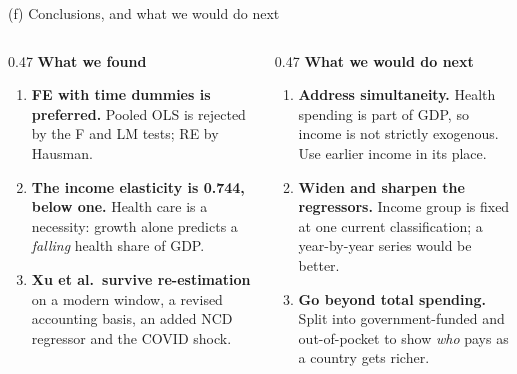\documentclass[10pt,aspectratio=169,t]{beamer}
\begin{document}
\begin{frame}{(f) Conclusions, and what we would do next}
\vspace{0.4em}
{\small
\begin{columns}[T]

\begin{column}{0.47\textwidth}
\textbf{What we found}
\vspace{0.4em}
\begin{enumerate}\setlength\itemsep{0.55em}
  \item \textbf{FE with time dummies is preferred.} Pooled OLS is rejected by
        the F and LM tests; RE by Hausman.
  \item \textbf{The income elasticity is 0.744, below one.} Health care is a
        necessity: growth alone predicts a \emph{falling} health share of GDP.
  \item \textbf{Xu et al.\ survive re-estimation} on a modern window, a revised
        accounting basis, an added NCD regressor and the COVID shock.
\end{enumerate}
\end{column}

\begin{column}{0.47\textwidth}
\textbf{What we would do next}
\vspace{0.4em}
\begin{enumerate}\setlength\itemsep{0.55em}
  \item \textbf{Address simultaneity.} Health spending is part of GDP, so income
        is not strictly exogenous. Use earlier income in its place.
  \item \textbf{Widen and sharpen the regressors.} Income group is fixed at one
        current classification; a year-by-year series would be better.
  \item \textbf{Go beyond total spending.} Split into government-funded and
        out-of-pocket to show \emph{who} pays as a country gets richer.
\end{enumerate}
\end{column}

\end{columns}}
\end{frame}
\end{document}
